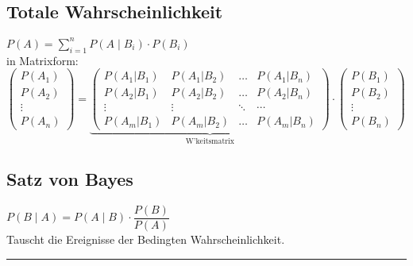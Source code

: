 \begin{minipage}[t]{0.6\textwidth}
	\vspace{2mm}
	\subsection{Totale Wahrscheinlichkeit}
		$\boxed{P(A)=\sum\limits_{i=1}^n P(A\mid B_i)\cdot P(B_i)}$ \\
	
		in Matrixform: \\
		$\begin{pmatrix}P(A_1)\\P(A_2)\\\vdots\\P(A_n)\end{pmatrix} = 
		\underbrace{\begin{pmatrix}P(A_1|B_1) & P(A_1|B_2) & \ldots & P(A_1|B_n) \\
		P(A_2|B_1) & P(A_2|B_2) & \ldots & P(A_2|B_n) \\
		\vdots & \vdots & \ddots & \cdots \\
		P(A_m|B_1) & P(A_m|B_2) & \ldots & P(A_m|B_n)\end{pmatrix}}_{\text{W'keitsmatrix}}
		\cdot \begin{pmatrix}P(B_1)\\P(B_2)\\\vdots\\P(B_n)\end{pmatrix}$
		\vspace{.2cm}
\end{minipage} \hspace{0.05\textwidth} \vrule \hspace{0.05\textwidth}
\begin{minipage}[t]{0.3\textwidth}
	\vspace{2mm}
	\subsection{Satz von Bayes}
	$\boxed{P(B\mid A)=P(A\mid B) \cdot\dfrac{P(B)}{P(A)}}$\\[2pt]
	Tauscht die Ereignisse der Bedingten Wahrscheinlichkeit. 
	\vspace{.2cm}
\end{minipage}
\hrule

